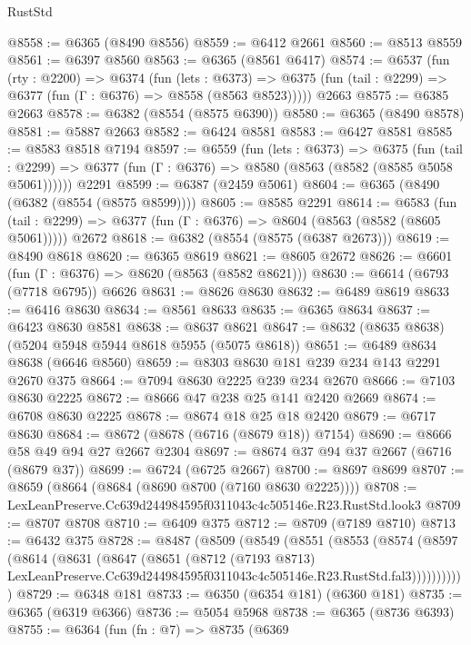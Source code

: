 \begin{lexlean}{RustStd}
\begin{coremodule}
@8558 := @6365 (@8490 @8556)
@8559 := @6412 @2661
@8560 := @8513 @8559
@8561 := @6397 @8560
@8563 := @6365 (@8561 @6417)
@8574 := @6537
    (fun (rty : @2200) =>
    @6374
      (fun (lets : @6373) =>
      @6375 (fun (tail : @2299) => @6377 (fun (Γ : @6376) => @8558 (@8563 @8523)))))
    @2663
@8575 := @6385 @2663
@8578 := @6382 (@8554 (@8575 @6390))
@8580 := @6365 (@8490 @8578)
@8581 := @5887 @2663
@8582 := @6424 @8581
@8583 := @6427 @8581
@8585 := @8583 @8518 @7194
@8597 := @6559
    (fun (lets : @6373) =>
    @6375
      (fun (tail : @2299) => @6377 (fun (Γ : @6376) => @8580 (@8563 (@8582 (@8585 @5058 @5061))))))
    @2291
@8599 := @6387 (@2459 @5061)
@8604 := @6365 (@8490 (@6382 (@8554 (@8575 @8599))))
@8605 := @8585 @2291
@8614 := @6583
    (fun (tail : @2299) => @6377 (fun (Γ : @6376) => @8604 (@8563 (@8582 (@8605 @5061)))))
    @2672
@8618 := @6382 (@8554 (@8575 (@6387 @2673)))
@8619 := @8490 @8618
@8620 := @6365 @8619
@8621 := @8605 @2672
@8626 := @6601 (fun (Γ : @6376) => @8620 (@8563 (@8582 @8621)))
@8630 := @6614 (@6793 (@7718 @6795)) @6626
@8631 := @8626 @8630
@8632 := @6489 @8619
@8633 := @6416 @8630
@8634 := @8561 @8633
@8635 := @6365 @8634
@8637 := @6423 @8630 @8581
@8638 := @8637 @8621
@8647 := @8632 (@8635 @8638) (@5204 @5948 @5944 @8618 @5955 (@5075 @8618))
@8651 := @6489 @8634 @8638 (@6646 @8560)
@8659 := @8303 @8630 @181 @239 @234 @143 @2291 @2670 @375
@8664 := @7094 @8630 @2225 @239 @234 @2670
@8666 := @7103 @8630 @2225
@8672 := @8666 @47 @238 @25 @141 @2420 @2669
@8674 := @6708 @8630 @2225
@8678 := @8674 @18 @25 @18 @2420
@8679 := @6717 @8630
@8684 := @8672 (@8678 (@6716 (@8679 @18)) @7154)
@8690 := @8666 @58 @49 @94 @27 @2667 @2304
@8697 := @8674 @37 @94 @37 @2667 (@6716 (@8679 @37))
@8699 := @6724 (@6725 @2667)
@8700 := @8697 @8699
@8707 := @8659 (@8664 (@8684 (@8690 @8700 (@7160 @8630 @2225))))
@8708 := LexLeanPreserve.Cc639d244984595f0311043c4c505146e.R23.RustStd.look3
@8709 := @8707 @8708
@8710 := @6409 @375
@8712 := @8709 (@7189 @8710)
@8713 := @6432 @375
@8728 := @8487
    (@8509
      (@8549
        (@8551
          (@8553
            (@8574
              (@8597
                (@8614
                  (@8631
                    (@8647
                      (@8651
                        (@8712
                          (@7193 @8713)
                          LexLeanPreserve.Cc639d244984595f0311043c4c505146e.R23.RustStd.fal3)))))))))))
@8729 := @6348 @181
@8733 := @6350 (@6354 @181) (@6360 @181)
@8735 := @6365 (@6319 @6366)
@8736 := @5054 @5968
@8738 := @6365 (@8736 @6393)
@8755 := @6364
    (fun (fn : @7) =>
    @8735
      (@6369

\end{coremodule}
\end{lexlean}
